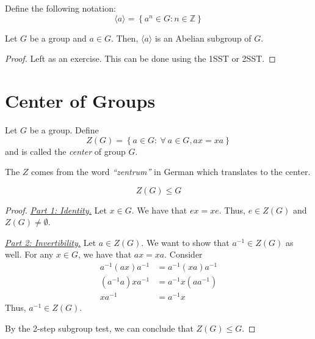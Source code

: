 \begin{remark}
\end{remark}

\begin{theorem}
    Define the following notation:
    \[
        \langle a \rangle = \left\{a^n \in G : n \in \mathbb{Z}\right\}
    \]

    Let \(G\) be a group and \(a \in G\). Then, \(\langle a \rangle\) is an Abelian subgroup of \(G\).
\end{theorem}

\begin{proof}
    Left as an exercise. This can be done using the 1SST or 2SST.
\end{proof}

\section{Center of Groups}

\begin{definition}
    Let \(G\) be a group. Define
    \[
        Z(G) = \left\{a \in G : \ \forall \ a \in G, ax = xa\right\}
    \]
    and is called the \textit{center} of group \(G\).
\end{definition}

\begin{distraction}
    The \(Z\) comes from the word \textit{``zentrum''} in German which translates to the center.
\end{distraction}

\begin{theorem}\label{thm:subgroup-center}
    \[
        Z(G) \leq G
    \]
\end{theorem}

\begin{proof}
    \underline{\textit{Part 1: Identity.}} Let \(x \in G\). We have that \(ex = xe\). Thus, \(e \in Z(G)\) and \(Z(G) \neq \emptyset\).

    \underline{\textit{Part 2: Invertibility.}} Let \(a \in Z(G)\). We want to show that \(a^{-1} \in Z(G)\) as well. For any \(x \in G\), we have that \(ax = xa\). Consider
    \[
    \begin{aligned}
        a^{-1}(ax)a^{-1} &= a^{-1}(xa)a^{-1} \\
        (a^{-1}a)xa^{-1} &= a^{-1}x(aa^{-1}) \\
        xa^{-1} &= a^{-1}x
    \end{aligned}
    \]
    Thus, \(a^{-1} \in Z(G)\).

    By the 2-step subgroup test, we can conclude that \(Z(G) \leq G\).
\end{proof}

